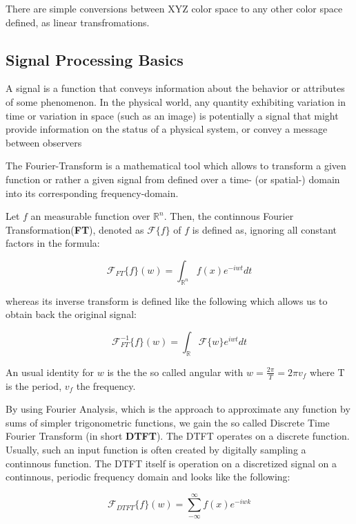 There are simple conversions between XYZ color space to any other color space defined, as linear transfromations.


\subsection{Signal Processing Basics}
A signal is a function that conveys information about the behavior or attributes of some phenomenon.
In the physical world, any quantity exhibiting variation in time or variation in space (such as an image) is potentially a signal that might provide information on the status of a physical system, or convey a message between observers

The Fourier-Transform is a mathematical tool which allows to transform a given function or rather a given signal from defined over a time- (or spatial-) domain into its corresponding frequency-domain.
 
Let $f$ an measurable function over $\mathds{R}^n$. Then, the continnous Fourier Transformation(\textbf{FT}), denoted as $\mathcal{F}\{f\}$ of $f$ is defined as, ignoring all constant factors in the formula:
 
\begin{equation}
  \mathcal{F}_{FT}\{f\}(w) = \int_{\mathds{R}^n} f(x)e^{-iwt} dt
\end{equation}

whereas its inverse transform is defined like the following which allows us to obtain back the original signal:

\begin{equation}
  \mathcal{F}_{FT}^{-1}\{f\}(w) = \int_{\mathds{R}} \mathcal{F}\{w\}e^{iwt} dt
\end{equation}

An usual identity for $w$ is the the so called angular with $w = \frac{2 \pi}{T} = 2 \pi v_f$ where T is the period, $v_f$ the frequency.

By using Fourier Analysis, which is the approach to approximate any function by sums of simpler trigonometric functions, we gain the so called Discrete Time Fourier Transform (in short \textbf{DTFT}). The DTFT operates on a discrete function. Usually, such an input function is often created by digitally sampling a continnous function. The DTFT itself is operation on a discretized signal on a continnous, periodic frequency domain and looks like the following:

\begin{equation}
  \mathcal{F}_{DTFT}\{f\}(w) = \sum_{-\infty}^{\infty} f(x) e^{-iwk}
\end{equation}

